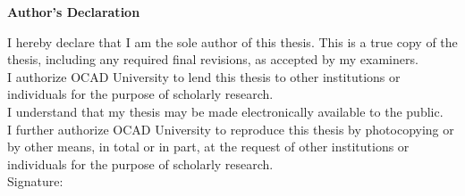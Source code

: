 \begin{center}
\large\textbf{Author's Declaration}
\end{center}

\noindent
I hereby declare that I am the sole author of this thesis. This is a true copy of the thesis, including any required final revisions, as accepted by my examiners.
\\[0.5cm]
I authorize OCAD University to lend this thesis to other institutions or individuals for the purpose of scholarly research.
\\[0.5cm]
I understand that my thesis may be made electronically available to the public.
\\[0.5cm]
I further authorize OCAD University to reproduce this thesis by photocopying or by other means, in total or in part, at the request of other institutions or individuals for the purpose of scholarly research.
\\[1cm]
Signature: \hspace{0.25cm} \makebox[7.5cm]{\hrulefill}		%